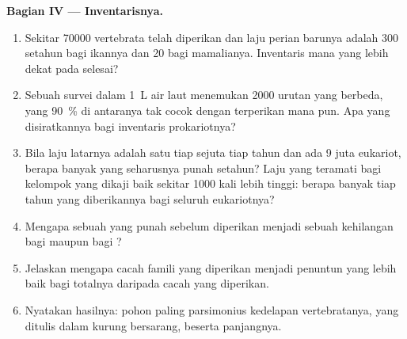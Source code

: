\begin{problem}
\medskip
\noindent\textbf{Bagian IV --- Inventarisnya.}
\begin{enumerate}[resume]
  \item Sekitar \num{70000}  vertebrata telah diperikan dan
        laju perian barunya adalah \num{300} setahun bagi ikannya dan
        \num{20} bagi mamalianya. Inventaris mana yang lebih dekat
        pada selesai?
  \item Sebuah survei  dalam \qty{1}{L} air laut menemukan
        \num{2000} urutan  yang berbeda, yang \qty{90}{\%} di
        antaranya tak cocok dengan  terperikan mana pun. Apa
        yang disiratkannya bagi inventaris prokariotnya?
  \item Bila laju  latarnya adalah satu  tiap sejuta
        tiap tahun dan ada \num{9} juta  eukariot, berapa banyak
        yang seharusnya punah setahun? Laju yang teramati bagi kelompok
        yang dikaji baik sekitar \num{1000} kali lebih tinggi: berapa
        banyak tiap tahun yang diberikannya bagi seluruh eukariotnya?
  \item Mengapa sebuah  yang punah sebelum diperikan menjadi
        sebuah kehilangan bagi  maupun bagi ?
  \item Jelaskan mengapa cacah famili yang diperikan menjadi penuntun
        yang lebih baik bagi totalnya daripada cacah  yang
        diperikan.
  \item Nyatakan hasilnya: pohon paling parsimonius kedelapan
        vertebratanya, yang ditulis dalam kurung bersarang, beserta
        panjangnya.
\end{enumerate}
\end{problem}
